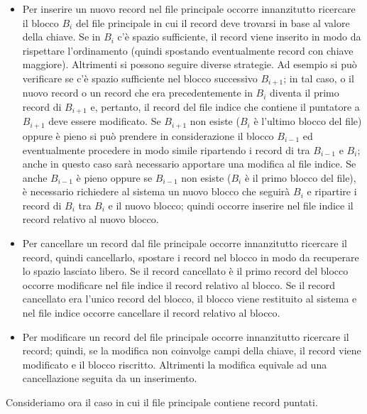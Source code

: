 \begin{itemize}
    \item Per inserire un nuovo record nel file principale occorre innanzitutto ricercare il blocco $B_i$ del file principale in cui il record deve trovarsi in base al valore della chiave. Se in $B_i$ c'è spazio sufficiente, il record viene inserito in modo da rispettare l'ordinamento (quindi spostando eventualmente record con chiave maggiore). Altrimenti si possono seguire diverse strategie. Ad esempio si può verificare se c'è spazio sufficiente nel blocco successivo $B_{i+1}$; in tal caso, o il nuovo record o un record che era precedentemente in $B_i$ diventa il primo record di $B_{i+1}$ e, pertanto, il record del file indice che contiene il puntatore a $B_{i+1}$ deve essere modificato. Se $B_{i+1}$ non esiste ($B_i$ è l'ultimo blocco del file) oppure è pieno si può prendere in considerazione il blocco $B_{i-1}$ ed eventualmente procedere in modo simile ripartendo i record di tra $B_{i-1}$ e $B_i$; anche in questo caso sarà necessario apportare una modifica al file indice. Se anche $B_{i-1}$ è pieno oppure se $B_{i-1}$ non esiste ($B_i$ è il primo blocco del file), è necessario richiedere al sistema un nuovo blocco che seguirà $B_i$ e ripartire i record di $B_i$ tra $B_i$ e il nuovo blocco; quindi occorre inserire nel file indice il record relativo al nuovo blocco.

    \item Per cancellare un record dal file principale occorre innanzitutto ricercare il record, quindi cancellarlo, spostare i record nel blocco in modo da recuperare lo spazio lasciato libero. Se il record cancellato è il primo record del blocco occorre modificare nel file indice il record relativo al blocco. Se il record cancellato era l'unico record del blocco, il blocco viene restituito al sistema e nel file indice occorre cancellare il record relativo al blocco.

    \item Per modificare un record del file principale occorre innanzitutto ricercare il record; quindi, se la modifica non coinvolge campi della chiave, il record viene modificato e il blocco riscritto. Altrimenti la modifica equivale ad una cancellazione seguita da un inserimento.
\end{itemize}

Consideriamo ora il caso in cui il file principale contiene record puntati.

